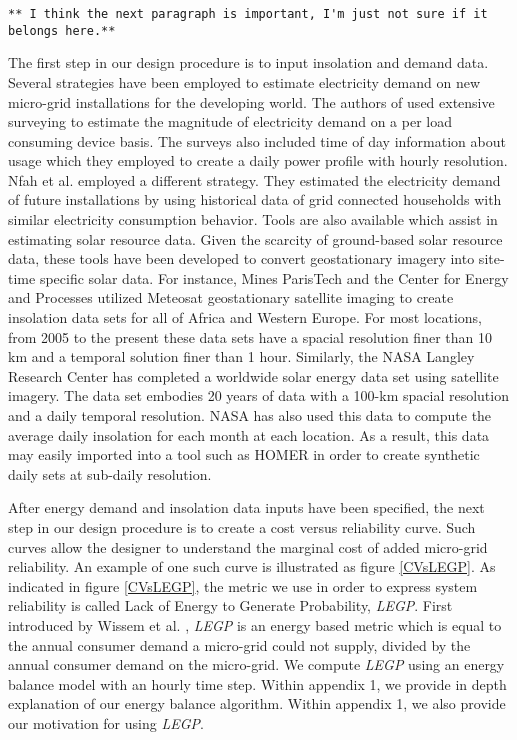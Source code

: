 \documentclass[11p]{article}
\begin{document}
\begin{verbatim}
** I think the next paragraph is important, I'm just not sure if it belongs here.**
\end{verbatim} 
The first step in our design procedure is to input insolation and demand data. 
Several strategies have been employed to estimate electricity demand on new micro-grid installations for the developing world. 
The authors of \cite{Camblong,Alzola} used extensive surveying to estimate the magnitude of electricity demand on a per load consuming device basis. 
The surveys also included time of day information about usage which they employed to create a daily power profile with hourly resolution. 
Nfah et al. \cite{Nfah} employed a different strategy.
They estimated the electricity demand of future installations by using historical data of grid connected households with similar electricity consumption behavior. 
Tools are also available which assist in estimating solar resource data.
Given the scarcity of ground-based solar resource data, these tools have been developed to convert geostationary imagery into site-time specific solar data. 
For instance, Mines ParisTech and the Center for Energy and Processes utilized Meteosat geostationary satellite imaging to create insolation data sets for all of Africa and Western Europe. 
For most locations, from 2005 to the present these data sets have a spacial resolution finer than 10 km and a temporal solution finer than 1 hour.  
Similarly, the NASA Langley Research Center has completed a worldwide solar energy data set using satellite imagery. 
The data set embodies 20 years of data with a 100-km spacial resolution and a daily temporal resolution.  
NASA has also used this data to compute the average daily insolation for each month at each location.
As a result, this data may easily imported into a tool such as HOMER in order to create synthetic daily sets at sub-daily resolution.   

After energy demand and insolation data inputs have been specified, the next step in our design procedure is to create a cost versus reliability curve. 
Such curves allow the designer to understand the marginal cost of added micro-grid reliability.
An example of one such curve is illustrated as figure \ref{CVsLEGP}.
As indicated in figure \ref{CVsLEGP}, the metric we use in order to express system reliability is called Lack of Energy to Generate Probability, \emph{LEGP}. 
First introduced by Wissem et al. \cite{Wissem}, \emph{LEGP} is an energy based metric which is equal to the annual consumer demand a micro-grid could not supply, divided by the annual consumer demand on the micro-grid.
We compute \emph{LEGP} using an energy balance model with an hourly time step. 
Within appendix 1, we provide in depth explanation of our energy balance algorithm.
Within appendix 1, we also provide our motivation for using \emph{LEGP}.
\end{document}

